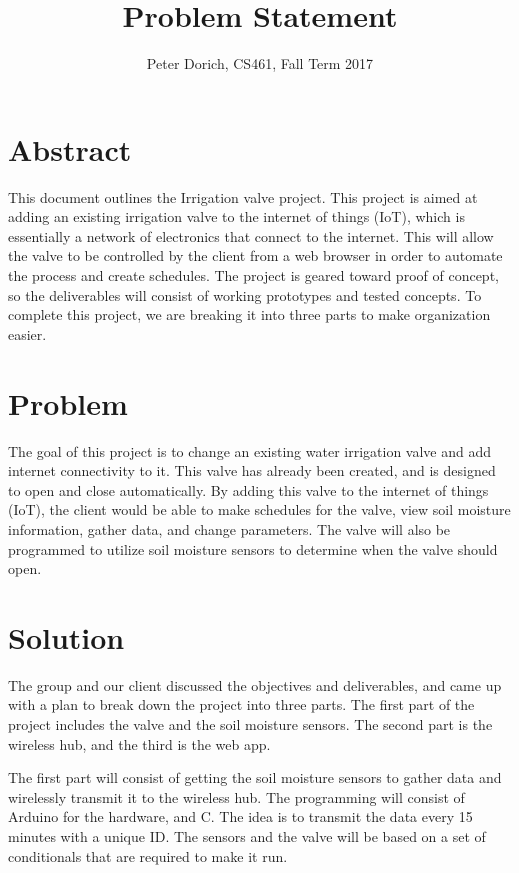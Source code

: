 \documentclass[journal,10pt,onecolumn,draftclsnofoot,]{IEEEtran}
\begin{document}
\title{Problem Statement}
\author{Peter Dorich, CS461, Fall Term 2017}
\maketitle
\nocite{*}

\section{Abstract}
This document outlines the Irrigation valve project. This project is aimed at adding an existing irrigation valve to the internet of things (IoT), which is essentially a network of electronics that connect to the internet. This will allow the valve to be controlled by the client from a web browser in order to automate the process and create schedules. The project is geared toward proof of concept, so the deliverables will consist of working prototypes and tested concepts. To complete this project, we are breaking it into three parts to make organization easier. 

\newpage
\section{Problem}
The goal of this project is to change an existing water irrigation valve and add internet connectivity to it. This valve has already been created, and is designed to open and close automatically. By adding this valve to the internet of things (IoT), the client would be able to make schedules for the valve, view soil moisture information, gather data, and change parameters. The valve will also be programmed to utilize soil moisture sensors to determine when the valve should open.
\newline

\section{Solution}
The group and our client discussed the objectives and deliverables, and came up with a plan to break down the project into three parts. The first part of the project includes the valve and the soil moisture sensors. The second part is the wireless hub, and the third is the web app. 
\newline

The first part will consist of getting the soil moisture sensors to gather data and wirelessly transmit it to the wireless hub. The programming will consist of Arduino for the hardware, and C. The idea is to transmit the data every 15 minutes with a unique ID. The sensors and the valve will be based on a set of conditionals that are required to make it run.  
\newline
\end{document}
